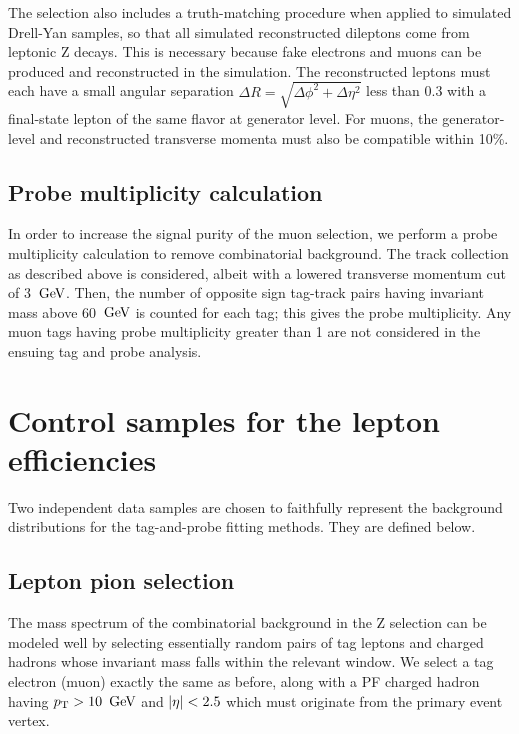 The selection also includes a truth-matching procedure when applied to simulated Drell-Yan samples,
so that all simulated reconstructed dileptons come from leptonic Z decays.
This is necessary because fake electrons and muons can be produced and reconstructed in the simulation.
The reconstructed leptons must each have a small angular separation $\Delta R = \sqrt{ \Delta\phi^{2} + \Delta\eta^{2} }$ 
less than 0.3 with a final-state lepton of the same flavor at generator level. For muons, the generator-level and reconstructed
transverse momenta must also be compatible within 10\%.

\subsection{Probe multiplicity calculation}
In order to increase the signal purity of the muon selection, we perform a probe multiplicity calculation to
remove combinatorial background. The track collection as described above is considered, albeit with a 
lowered transverse momentum cut of 3 $\,\text{Ge\hspace{-.08em}V}$. Then, the number of opposite sign tag-track pairs having invariant mass above
60 $\,\text{Ge\hspace{-.08em}V}$ is counted for each tag; this gives the probe multiplicity. Any muon tags having probe multiplicity
greater than 1 are not considered in the ensuing tag and probe analysis.

\section{Control samples for the lepton efficiencies}
Two independent data samples are chosen to faithfully represent the background distributions for the
tag-and-probe fitting methods. They are defined below.
\label{sec:tnpcontrol}

\subsection{Lepton pion selection}
The mass spectrum of the combinatorial background in the Z selection can be modeled well by selecting
essentially random pairs of tag leptons and charged hadrons whose invariant mass falls within the relevant window.
We select a tag electron (muon) exactly the same as before, along with a PF charged hadron having $p_{\mathrm{T}}>10~\,\text{Ge\hspace{-.08em}V}$ and $\lvert \eta \rvert<2.5$
which must originate from the primary event vertex.

